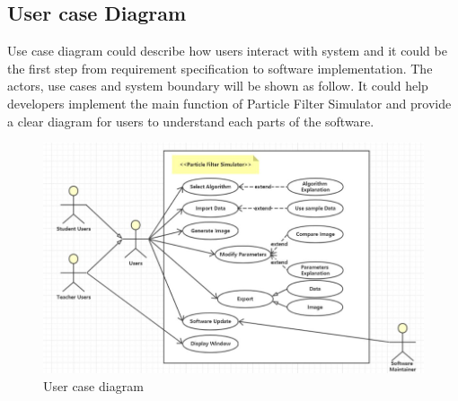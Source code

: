 \documentclass[11pt,oneside,a4paper]{article}
\begin{document}
\subsection{User case Diagram}
Use case diagram could describe how users interact with system and it could be the first step from requirement specification to software implementation. The actors, use cases and system boundary will be shown as follow. It could help developers implement the main function of Particle Filter Simulator and provide a clear diagram for users to understand each parts of the software.
\begin{figure}[H]
  \begin{center}
  \includegraphics[height=0.4\textheight]{./source/Requirement/1.png}
  \caption{User case diagram}
  \label{}
  \end{center}
\end{figure}
\end{document}
